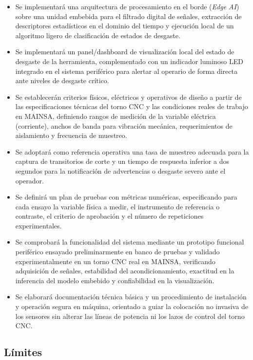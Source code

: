 \begin{itemize}
\item Se implementará una arquitectura de procesamiento en el borde (\textit{Edge AI}) sobre una unidad embebida para el filtrado digital de señales, extracción de descriptores estadísticos en el dominio del tiempo y ejecución local de un algoritmo ligero de clasificación de estados de desgaste.
\item Se implementará un panel/dashboard de visualización local del estado de desgaste de la herramienta, complementado con un indicador luminoso LED integrado en el sistema periférico para alertar al operario de forma directa ante niveles de desgaste crítico.
\item Se establecerán criterios físicos, eléctricos y operativos de diseño a partir de las especificaciones técnicas del torno CNC y las condiciones reales de trabajo en MAINSA, definiendo rangos de medición de la variable eléctrica (corriente), anchos de banda para vibración mecánica, requerimientos de aislamiento y frecuencia de muestreo.
\item Se adoptará como referencia operativa una tasa de muestreo adecuada para la captura de transitorios de corte y un tiempo de respuesta inferior a dos segundos para la notificación de advertencias o desgaste severo ante el operador.
\item Se definirá un plan de pruebas con métricas numéricas, especificando para cada ensayo la variable física a medir, el instrumento de referencia o contraste, el criterio de aprobación y el número de repeticiones experimentales.
\item Se comprobará la funcionalidad del sistema mediante un prototipo funcional periférico ensayado preliminarmente en banco de pruebas y validado experimentalmente en un torno CNC real en MAINSA, verificando adquisición de señales, estabilidad del acondicionamiento, exactitud en la inferencia del modelo embebido y confiabilidad en la visualización.
\item Se elaborará documentación técnica básica y un procedimiento de instalación y operación segura en máquina, orientado a guiar la colocación no invasiva de los sensores sin alterar las líneas de potencia ni los lazos de control del torno CNC.
\end{itemize}

\subsection{Límites}

